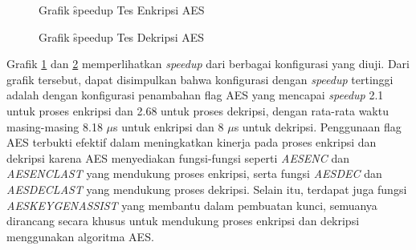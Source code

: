 \begin{figure}
    \centering
    \caption{Grafik \f{speedup} Tes Enkripsi AES}
    \label{fig:aes_encrypt_test_graph}
\end{figure}

\begin{figure}
    \centering
    \caption{Grafik \f{speedup} Tes Dekripsi AES}
    \label{fig:aes_decrypt_test_graph}
\end{figure}

Grafik \ref{fig:aes_encrypt_test_graph} dan \ref{fig:aes_decrypt_test_graph} memperlihatkan \textit{speedup} dari berbagai konfigurasi yang diuji. Dari grafik tersebut, dapat disimpulkan bahwa konfigurasi dengan \textit{speedup} tertinggi adalah dengan konfigurasi penambahan flag AES yang mencapai \textit{speedup} 2.1 untuk proses enkripsi dan 2.68 untuk proses dekripsi, dengan rata-rata waktu masing-masing 8.18 $\mu$s untuk enkripsi dan 8 $\mu$s untuk dekripsi. Penggunaan flag AES terbukti efektif dalam meningkatkan kinerja pada proses enkripsi dan dekripsi karena AES menyediakan fungsi-fungsi seperti \textit{AESENC} dan \textit{AESENCLAST} yang mendukung proses enkripsi, serta fungsi \textit{AESDEC} dan \textit{AESDECLAST} yang mendukung proses dekripsi. Selain itu, terdapat juga fungsi \textit{AESKEYGENASSIST} yang membantu dalam pembuatan kunci, semuanya dirancang secara khusus untuk mendukung proses enkripsi dan dekripsi menggunakan algoritma AES.

